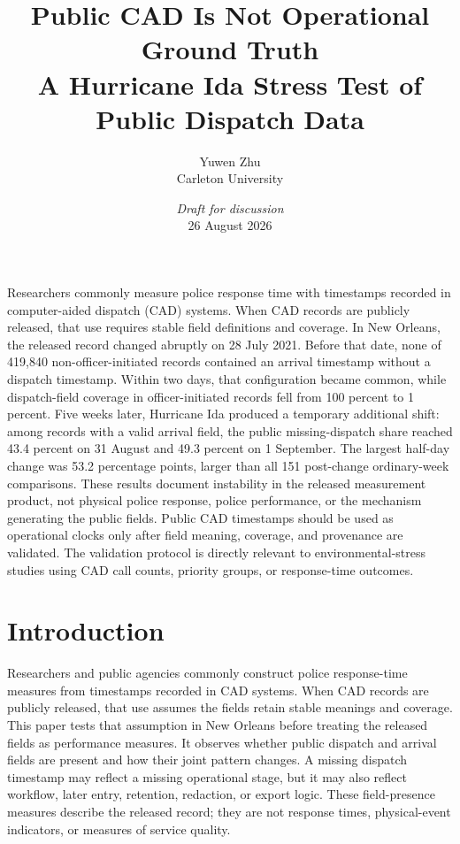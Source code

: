 \documentclass[11pt]{article}
\title{\vspace{-1.7em}\textbf{Public CAD Is Not Operational Ground Truth}\\[0.35em]
\large A Hurricane Ida Stress Test of Public Dispatch Data}
\author{Yuwen Zhu\\Carleton University}
\date{\textit{Draft for discussion}\\[0.2em]26 August 2026}
\begin{document}
\maketitle
\thispagestyle{plain}
\vspace{-1.3em}

\begin{plainbox}[title=Abstract]
Researchers commonly measure police response time with timestamps recorded in computer-aided dispatch (CAD) systems. When CAD records are publicly released, that use requires stable field definitions and coverage. In New Orleans, the released record changed abruptly on 28 July 2021. Before that date, none of 419,840 non-officer-initiated records contained an arrival timestamp without a dispatch timestamp. Within two days, that configuration became common, while dispatch-field coverage in officer-initiated records fell from 100 percent to 1 percent. Five weeks later, Hurricane Ida produced a temporary additional shift: among records with a valid arrival field, the public missing-dispatch share reached 43.4 percent on 31 August and 49.3 percent on 1 September. The largest half-day change was 53.2 percentage points, larger than all 151 post-change ordinary-week comparisons. These results document instability in the released measurement product, not physical police response, police performance, or the mechanism generating the public fields. Public CAD timestamps should be used as operational clocks only after field meaning, coverage, and provenance are validated. The validation protocol is directly relevant to environmental-stress studies using CAD call counts, priority groups, or response-time outcomes.
\end{plainbox}


\section{Introduction}

Researchers and public agencies commonly construct police response-time measures from timestamps recorded in CAD systems. When CAD records are publicly released, that use assumes the fields retain stable meanings and coverage. This paper tests that assumption in New Orleans before treating the released fields as performance measures. It observes whether public dispatch and arrival fields are present and how their joint pattern changes. A missing dispatch timestamp may reflect a missing operational stage, but it may also reflect workflow, later entry, retention, redaction, or export logic. These field-presence measures describe the released record; they are not response times, physical-event indicators, or measures of service quality.
\end{document}
